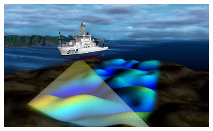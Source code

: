 \begin{minipage}{.5\textwidth}
\begin{figure}[H]
\begin{center}
\includegraphics[width=.8\textwidth]{photos/sonar_NOAANationalOceanService_flickr.jpg}
% 

\end{center}
\end{figure}
\end{minipage}
